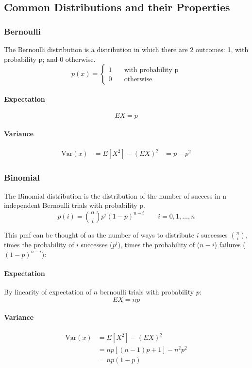 \subsection{Common Distributions and their Properties}
\subsubsection{Bernoulli}
The Bernoulli distribution is a distribution in which there are 2 outcomes: 1, with probability p; and 0 otherwise.
    \[
        p(x) = \begin{cases}
            1 & \quad \text{with probability p} \\
            0 & \quad \text{otherwise}
        \end{cases}
    \]

\paragraph{Expectation}
$$EX = p$$

\paragraph{Variance}
    \begin{equation*}
    \begin{aligned}
        \text{Var}(x) &= E[X^2] - (EX)^2
                      &= p - p^2
    \end{aligned}
    \end{equation*}
\subsubsection{Binomial}
The Binomial distribution is the distribution of the number of success in n independent Bernoulli trials with probability p.
$$p(i) = \binom{n}{i}p^i(1-p)^{n-i} \qquad i=0,1,\dots,n$$

This pmf can be thought of as the number of ways to distribute $i$ successes $\binom{n}{i}$, times the probability of $i$ successes ($p^i$), times the probability of ($n-i$) failures ($(1-p)^{n-i}$):

\paragraph{Expectation}
By linearity of expectation of $n$ bernoulli trials with probability $p$:
$$EX = np $$

\paragraph{Variance}
    \begin{equation*}
    \begin{aligned}
        \text{Var}(x) &= E[X^2] - (EX)^2 \\
                      &= np[(n-1)p+1] - n^2p^2 \\
                      &= np(1-p)
    \end{aligned}
    \end{equation*}

